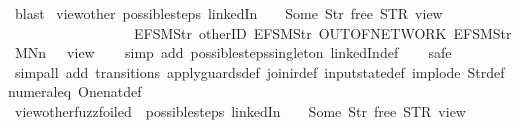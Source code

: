 \begin{isabellebody}
\ blast%
\endisatagproof
{\isafoldproof}%
%
\isadelimproof
\isanewline
%
\endisadelimproof
\isanewline
{}\isamarkupfalse%
\ view{\isacharunderscore}other{\isacharcolon}\ {\isachardoublequoteopen}possible{\isacharunderscore}steps\ linkedIn\ {}\ {\isacharparenleft}{\isacharless}{\isachargreater}{\isacharparenleft}{}\ {\isachardollar}{\isacharcolon}{\isacharequal}\ Some\ {\isacharparenleft}Str\ {\isacharprime}{\isacharprime}free{\isacharprime}{\isacharprime}{\isacharparenright}{\isacharparenright}{\isacharparenright}\ STR\ {\isacharprime}{\isacharprime}view{\isacharprime}{\isacharprime}\isanewline
\ \ \ \ \ \ \ \ \ \ \ \ \ \ \ \ \ \ {\isacharbrackleft}EFSM{\isachardot}Str\ {\isacharprime}{\isacharprime}otherID{\isacharprime}{\isacharprime}{\isacharcomma}\ EFSM{\isachardot}Str\ {\isacharprime}{\isacharprime}OUT{\isacharunderscore}OF{\isacharunderscore}NETWORK{\isacharprime}{\isacharprime}{\isacharcomma}\ EFSM{\isachardot}Str\ {\isacharprime}{\isacharprime}MNn{}{\isacharprime}{\isacharprime}{\isacharbrackright}\ {\isacharequal}\ {\isacharbraceleft}{\isacharbar}{\isacharparenleft}{}{\isacharcomma}\ view{}{\isacharparenright}{\isacharbar}{\isacharbraceright}{\isachardoublequoteclose}\isanewline
%
\isadelimproof
\ \ %
\endisadelimproof
%
\isatagproof
{}\isamarkupfalse%
\ {\isacharparenleft}simp\ add{\isacharcolon}\ possible{\isacharunderscore}steps{\isacharunderscore}singleton\ linkedIn{\isacharunderscore}def{\isacharparenright}\isanewline
\ \ \isamarkupfalse%
\ safe\isanewline
\ \ \isamarkupfalse%
\ {\isacharparenleft}simp{\isacharunderscore}all\ add{\isacharcolon}\ transitions\ apply{\isacharunderscore}guards{\isacharunderscore}def\ join{\isacharunderscore}ir{\isacharunderscore}def\ input{}state{\isacharunderscore}def\ implode\ Str{\isacharunderscore}def\ numeral{\isacharunderscore}{}{\isacharunderscore}eq{\isacharunderscore}{}\ One{\isacharunderscore}nat{\isacharunderscore}def{\isacharparenright}%
\endisatagproof
{\isafoldproof}%
%
\isadelimproof
\isanewline
%
\endisadelimproof
\isanewline
{}\isamarkupfalse%
\ view{\isacharunderscore}other{\isacharunderscore}fuzz{\isacharunderscore}foiled{\isacharcolon}\ {\isachardoublequoteopen}\ possible{\isacharunderscore}steps\ linkedIn\ {}\ {\isacharparenleft}{\isacharless}{\isachargreater}{\isacharparenleft}{}\ {\isachardollar}{\isacharcolon}{\isacharequal}\ Some\ {\isacharparenleft}Str\ {\isacharprime}{\isacharprime}free{\isacharprime}{\isacharprime}{\isacharparenright}{\isacharparenright}{\isacharparenright}\ STR\ {\isacharprime}{\isacharprime}view{\isacharprime}{\isacharprime}\isanewline

\end{isabellebody}
